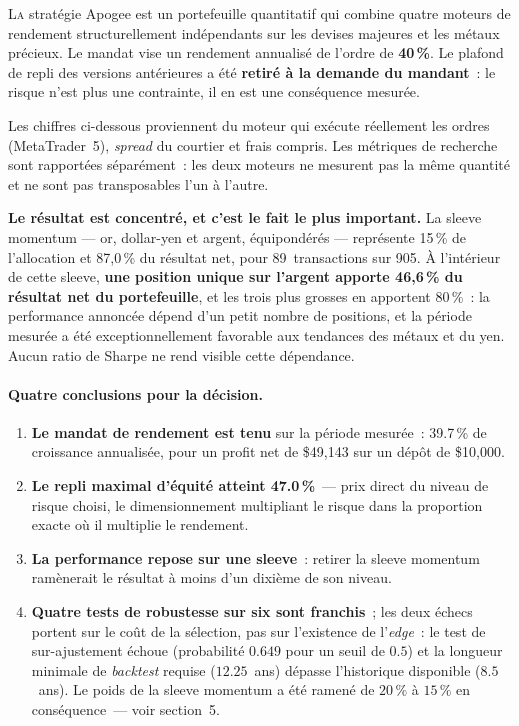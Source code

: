 \documentclass[11pt, a4paper]{scrartcl}
\begin{document}
\lettrine[lines=2, findent=2pt, nindent=0pt]{L}{a} stratégie Apogee est un
portefeuille quantitatif qui combine quatre moteurs de rendement structurellement
indépendants sur les devises majeures et les métaux précieux. Le mandat vise un rendement annualisé
de l'ordre de \textbf{40\,\%}. Le plafond de repli des versions antérieures a été
\textbf{retiré à la demande du mandant}~: le risque n'est plus une contrainte, il en
est une conséquence mesurée.

Les chiffres ci-dessous proviennent du moteur qui exécute réellement les ordres
(MetaTrader~5), \emph{spread} du courtier et frais compris. Les métriques de
recherche sont rapportées séparément~: les deux moteurs ne mesurent pas la même
quantité et ne sont pas transposables l'un à l'autre.



\begin{insightbox}
\textbf{Le résultat est concentré, et c'est le fait le plus important.} La sleeve momentum
--- or, dollar-yen et argent, équipondérés --- représente 15\,\% de l'allocation et
87,0\,\% du résultat net, pour 89~transactions sur
905. À l'intérieur de cette sleeve, \textbf{une position unique sur l'argent apporte
46,6\,\% du résultat net du portefeuille}, et les trois plus grosses en apportent 80\,\%~:
la performance annoncée dépend d'un petit nombre de positions, et la période mesurée a
été exceptionnellement favorable aux tendances des métaux et du yen. Aucun ratio de
Sharpe ne rend visible cette dépendance.
\end{insightbox}



\paragraph{Quatre conclusions pour la décision.}
\begin{enumerate}
\item \textbf{Le mandat de rendement est tenu} sur la période mesurée~:
39.7\,\% de croissance annualisée, pour un profit net de
\$49,143 sur un dépôt de \$10,000.
\item \textbf{Le repli maximal d'équité atteint 47.0\,\%}~---
prix direct du niveau de risque choisi, le dimensionnement multipliant le risque dans
la proportion exacte où il multiplie le rendement.
\item \textbf{La performance repose sur une sleeve}~: retirer la sleeve momentum
ramènerait le résultat à moins d'un dixième de son niveau.
\item \textbf{Quatre tests de robustesse sur six sont franchis}~; les deux échecs
portent sur le coût de la sélection, pas sur l'existence de l'\emph{edge}~: le test de
sur-ajustement échoue (probabilité $0.649$ pour un seuil de $0.5$) et la longueur
minimale de \emph{backtest} requise ($12.25$~ans) dépasse l'historique disponible
($8.5$~ans). Le poids de la sleeve momentum a été ramené de $20\,\%$ à $15\,\%$ en
conséquence~--- voir section~5.
\end{enumerate}
\end{document}
